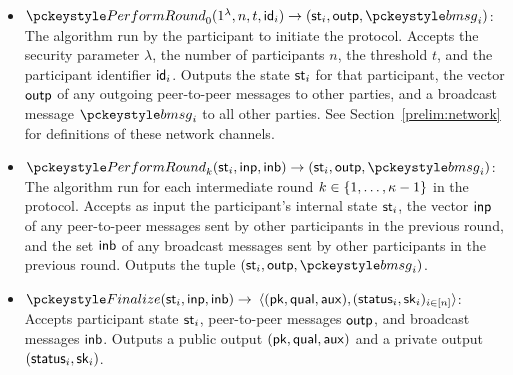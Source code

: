 \begin{definition}
\begin{itemize}
      \begin{itemize}
        \item $\dkgkeygen_0(1^\lambda, n, t, \id_i) \rightarrow (\party_i,\outvecp,\bmsg_i)$:
          The algorithm run by the participant to initiate the protocol.
          Accepts the security parameter $\lambda$,
          the number of participants $n$, the threshold $t$, and the participant identifier $\mathsf{id}_i$.
          Outputs the state $\mathsf{st}_i$ for that participant,
          the vector $\mathsf{outp}$ of any outgoing peer-to-peer messages to other parties,
          and a broadcast message $\bmsg_i$ to all other parties.
          See Section~\ref{prelim:network} for definitions of these network channels.
        \item $\dkgkeygen_k(\party_i, \invecp, \invecb) \rightarrow (\party_i, \outvecp, \bmsg_i)$:
          The algorithm run for each intermediate round $k \in \{ 1, \ldots, \kappa-1\}$ in the protocol.
          Accepts as input the participant's internal state $\mathsf{st}_i$,
          the vector $\mathsf{inp}$ of any peer-to-peer messages sent by other participants in the previous round,
          and the set $\mathsf{inb}$ of any broadcast messages sent by other participants in the previous round.
          Outputs the tuple $(\party_i, \outvecp, \bmsg_i)$.
        \item {\sloppy $\finalize(\party_i, \invecp, \invecb) \rightarrow$
          $\langle(\mathsf{pk}, \mathsf{qual},\mathsf{aux}),$\allowbreak$(\mathsf{status}_i, \mathsf{sk}_i)_{i \in [n]}\rangle$:
          Accepts participant state $\mathsf{st}_i$,
          peer-to-peer messages $\mathsf{outp}$, and broadcast messages $\mathsf{inb}$.
          Outputs a public output $(\mathsf{pk}, \mathsf{qual},\mathsf{aux})$
          and a private output $(\mathsf{status}_i, \mathsf{sk}_i)$.\par}
      \end{itemize}


\end{itemize}
\end{definition}
